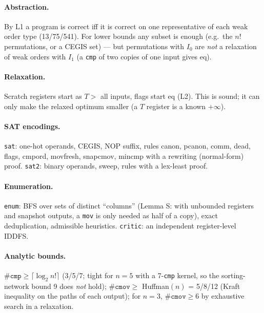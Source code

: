 \documentclass[11pt]{article}
\theoremstyle{remark}\newtheorem{remark}[theorem]{Remark}
\begin{document}
\paragraph{Abstraction.} By L1 a program is correct iff it is correct on one representative of each weak order type
(13/75/541). For lower bounds any subset is enough (e.g.\ the $n!$ permutations, or a CEGIS set) --- but permutations with
$I_0$ are \emph{not} a relaxation of weak orders with $I_1$ (a \texttt{cmp} of two copies of one input gives eq).
\paragraph{Relaxation.} Scratch registers start as $T > $ all inputs, flags start eq (L2). This is sound; it can only make
the relaxed optimum smaller (a $T$ register is a known $+\infty$).
\paragraph{SAT encodings.} \texttt{sat}: one-hot operands, CEGIS, NOP suffix, rules canon, pcanon, comm, dead, flags, cmpord, movfresh,
snapcmov, mincmp with a rewriting (normal-form) proof. \texttt{sat2}: binary operands, sweep, rules with a lex-least proof.
\paragraph{Enumeration.} \texttt{enum}: BFS over sets of distinct ``columns'' (Lemma S: with unbounded registers and snapshot
outputs, a \texttt{mov} is only needed as half of a copy), exact deduplication, admissible heuristics. \texttt{critic}: an
independent register-level IDDFS.
\paragraph{Analytic bounds.} $\#\texttt{cmp} \ge \lceil\log_2 n!\rceil$ (3/5/7; tight for $n=5$ with a 7-\texttt{cmp} kernel,
so the sorting-network bound 9 does \emph{not} hold); $\#\texttt{cmov} \ge$ Huffman$(n)$ = 5/8/12 (Kraft inequality on the
paths of each output); for $n=3$, $\#\texttt{cmov} \ge 6$ by exhaustive search in a relaxation.
\end{document}
